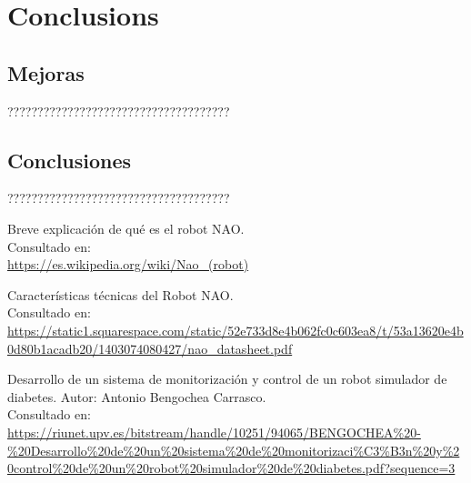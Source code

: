 \documentclass[12pt,spanish,listoffigures,listoftables]{tfgetsinf}
\begin{document}
\chapter{Conclusions}

\section{Mejoras} 

?????????????????????????????????????

\section{Conclusiones}

?????????????????????????????????????


\begin{thebibliography}{10}

   Breve explicación de qué es el robot NAO. \\
   \newblock Consultado en: \\ 
   \url{https://es.wikipedia.org/wiki/Nao_(robot)}
   
	Características técnicas del Robot NAO. \\
	\newblock Consultado en: \\
   	\url{https://static1.squarespace.com/static/52e733d8e4b062fc0c603ea8/t/53a13620e4b0d80b1acadb20/1403074080427/nao_datasheet.pdf}

	Desarrollo de un sistema de monitorización y control de un robot simulador de diabetes. Autor: Antonio Bengochea Carrasco. \\
	\newblock Consultado en: \\
	\url{https://riunet.upv.es/bitstream/handle/10251/94065/BENGOCHEA\%20-\%20Desarrollo\%20de\%20un\%20sistema\%20de\%20monitorizaci\%C3\%B3n\%20y\%20control\%20de\%20un\%20robot\%20simulador\%20de\%20diabetes.pdf?sequence=3}

\end{thebibliography}
\cleardoublepage
\end{document}
